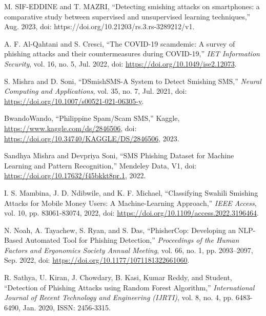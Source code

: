 \documentclass[conference]{IEEEtran}
\begin{document}
\begin{thebibliography}{00}
     M. SIF-EDDINE and T. MAZRI, ``Detecting smishing attacks on smartphones: a comparative study between supervised and unsupervised learning techniques,'' Aug. 2023, doi: https://doi.org/10.21203/rs.3.rs-3289212/v1.

    A. F. Al-Qahtani and S. Cresci, 
    ``The COVID-19 scamdemic: A survey of phishing attacks and their countermeasures during COVID-19,'' 
    \emph{IET Information Security}, vol. 16, no. 5, Jul. 2022, doi: \url{https://doi.org/10.1049/ise2.12073}.
    
    S. Mishra and D. Soni, 
    ``DSmishSMS-A System to Detect Smishing SMS,'' 
    \emph{Neural Computing and Applications}, vol. 35, no. 7, Jul. 2021, doi: \url{https://doi.org/10.1007/s00521-021-06305-y}.
    
    BwandoWando,
    ``Philippine Spam/Scam SMS,''
    Kaggle,
    \url{https://www.kaggle.com/ds/2846506},
    doi: \url{https://doi.org/10.34740/KAGGLE/DS/2846506},
    2023.
    
    Sandhya Mishra and Devpriya Soni,
    ``SMS Phishing Dataset for Machine Learning and Pattern Recognition,''
    Mendeley Data, V1,
    doi: \url{https://doi.org/10.17632/f45bkkt8pr.1},
    2022.

    I. S. Mambina, J. D. Ndibwile, and K. F. Michael, 
    ``Classifying Swahili Smishing Attacks for Mobile Money Users: A Machine-Learning Approach,'' 
    \emph{IEEE Access}, vol. 10, pp. 83061-83074, 2022, doi: \url{https://doi.org/10.1109/access.2022.3196464}.
    
    N. Noah, A. Tayachew, S. Ryan, and S. Das, 
    ``PhisherCop: Developing an NLP-Based Automated Tool for Phishing Detection,'' 
    \emph{Proceedings of the Human Factors and Ergonomics Society Annual Meeting}, vol. 66, no. 1, pp. 2093–2097, Sep. 2022, doi: \url{https://doi.org/10.1177/1071181322661060}.

     R. Sathya, U. Kiran, J. Chowdary, B. Kasi, Kumar Reddy, and Student, 
    ``Detection of Phishing Attacks using Random Forest Algorithm,'' 
    \emph{International Journal of Recent Technology and Engineering (IJRTI)}, 
    vol. 8, no. 4, pp. 6483-6490, Jan. 2020, ISSN: 2456-3315.
    


\end{thebibliography}
\end{document}

